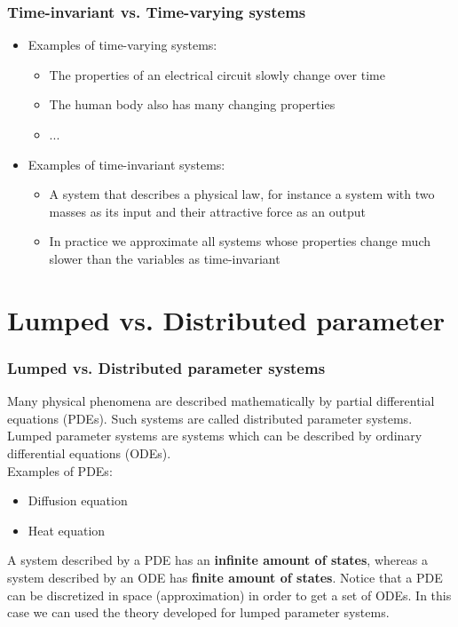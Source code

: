 \begin{frame}
	\frametitle{Time-invariant vs. Time-varying systems}
	\begin{itemize}
		\item Examples of time-varying systems:
		\smallskip
		\begin{itemize}
			\item \normalsize{The properties of an electrical circuit slowly change over time}
			\smallskip
			\item \normalsize{The human body also has many changing properties}
			\smallskip
			\item ...
		\end{itemize}
		\medskip
		\item Examples of time-invariant systems:
		\smallskip
		\begin{itemize}
			\item \normalsize{A system that describes a physical law, for instance a system with two masses as its input and their attractive force as an output}
			\smallskip
			\item \normalsize{In practice we approximate all systems whose properties change much slower than the variables as time-invariant}
		\end{itemize}
	\end{itemize}
\end{frame}

\section{Lumped vs. Distributed parameter} 

\begin{frame}
	\frametitle{Lumped vs. Distributed parameter systems}
	Many physical phenomena are described mathematically by partial differential equations (PDEs). Such systems are called distributed parameter systems.\\
	Lumped parameter systems are systems which can be described by ordinary differential equations (ODEs).\\
	Examples of PDEs:\\
	\begin{itemize}
		\item Diffusion equation
		\item Heat equation
	\end{itemize}
A system described by a PDE has an \textbf{infinite amount of states}, whereas a system described by an ODE has \textbf{finite amount of states}. Notice that a PDE can be discretized in space (approximation) in order to get a set of ODEs. In this case we can used the theory developed for lumped parameter systems.
%
\end{frame}

